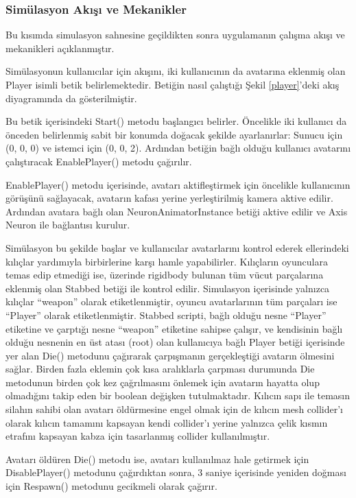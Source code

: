 \documentclass[a4paper, 12pt, titlepage]{article}
\begin{document}
\subsubsection{Simülasyon Akışı ve Mekanikler}

Bu kısımda simulasyon sahnesine geçildikten sonra uygulamanın çalışma akışı ve mekanikleri
açıklanmıştır.

Simülasyonun kullanıcılar için akışını, iki kullanıcının da avatarına eklenmiş olan Player isimli
betik belirlemektedir. Betiğin nasıl çalıştığı Şekil \ref{player}'deki akış diyagramında da
gösterilmiştir.

Bu betik içerisindeki Start() metodu başlangıcı belirler. Öncelikle iki kullanıcı da önceden
belirlenmiş sabit bir konumda doğacak şekilde ayarlanırlar: Sunucu için (0, 0, 0) ve istemci için
(0, 0, 2). Ardından betiğin bağlı olduğu kullanıcı avatarını çalıştıracak EnablePlayer() metodu
çağırılır.

EnablePlayer() metodu içerisinde, avatarı aktifleştirmek için öncelikle kullanıcının görüşünü
sağlayacak, avatarın kafası yerine yerleştirilmiş kamera aktive edilir. Ardından avatara bağlı olan
NeuronAnimatorInstance betiği aktive edilir ve Axis Neuron ile bağlantısı kurulur.

Simülasyon bu şekilde başlar ve kullanıcılar avatarlarını kontrol ederek ellerindeki kılıçlar
yardımıyla birbirlerine karşı hamle yapabilirler. Kılıçların oyunculara temas edip etmediği ise,
üzerinde rigidbody bulunan tüm vücut parçalarına eklenmiş olan Stabbed betiği ile kontrol edilir.
Simulasyon içerisinde yalnızca kılıçlar “weapon” olarak etiketlenmiştir, oyuncu avatarlarının tüm
parçaları ise “Player” olarak etiketlenmiştir. Stabbed scripti, bağlı olduğu nesne “Player”
etiketine ve çarptığı nesne “weapon” etiketine sahipse çalışır, ve kendisinin bağlı olduğu nesnenin
en üst atası (root) olan kullanıcıya bağlı Player betiği içerisinde yer alan Die() metodunu
çağırarak çarpışmanın gerçekleştiği avatarın ölmesini sağlar. Birden fazla eklemin çok kısa
aralıklarla çarpması durumunda Die metodunun birden çok kez çağrılmasını önlemek için avatarın
hayatta olup olmadığını takip eden bir boolean değişken tutulmaktadır. Kılıcın sapı ile temasın
silahın sahibi olan avatarı öldürmesine engel olmak için de kılıcın mesh collider’ı olarak kılıcın
tamamını kapsayan kendi collider’ı yerine yalnızca çelik kısmın etrafını kapsayan kabza için
tasarlanmış collider kullanılmıştır.

Avatarı öldüren Die() metodu ise, avatarı kullanılmaz hale getirmek için DisablePlayer() metodunu
çağırdıktan sonra, 3 saniye içerisinde yeniden doğması için Respawn() metodunu gecikmeli olarak
çağırır.
\end{document}
